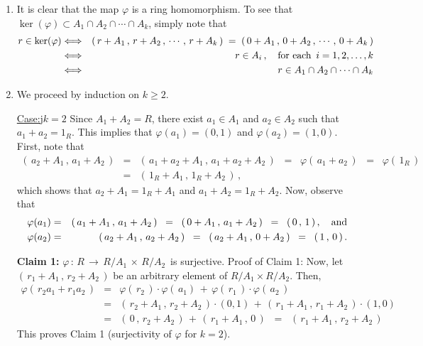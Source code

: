 \begin{enumerate}
\item
	It is clear that the map $\varphi$ is a ring homomorphism.
	To see that $\ker(\varphi) \subset A_{1} \cap A_{2} \cap \cdots \cap A_{k}$,
	simply note that
	\begin{eqnarray*}
	r \in \ker(\varphi)
	& \Longleftrightarrow &
		\left(\, r+A_{1} \,,\, r+A_{2} \,,\, \cdots \,,\, r+A_{k}\,\right)
		\; = \;
		\left(\, 0+A_{1} \,,\, 0+A_{2} \,,\, \cdots \,,\, 0+A_{k}\,\right)
	\\
	& \Longleftrightarrow &
		r \in A_{i}\,, \quad\textnormal{for each \,$i = 1, 2, \ldots, k$}
	\\
	& \Longleftrightarrow &
		r \in A_{1} \cap A_{2} \cap \cdots \cap A_{k}
	\end{eqnarray*}
\item
	We proceed by induction on $k \geq 2$.

	\vskip 0.1cm
	\underline{Case:{\color{white}j}$k = 2$}\quad
	Since $A_{1} + A_{2} = R$, there exist $a_{1} \in A_{1}$ and $a_{2} \in A_{2}$
	such that $a_{1} + a_{2} = 1_{R}$.
	This implies that $\varphi(a_{1}) = (0,1)$ and $\varphi(a_{2}) = (1,0)$.
	First, note that
	\begin{eqnarray*}
	(\,a_{2} + A_{1} \,,\, a_{1} + A_{2}\,)
	& = &
		(\,a_{1} + a_{2} + A_{1} \,,\, a_{1} + a_{2} + A_{2}\,)
	\;\; = \;\;
		\varphi(\,a_{1} + a_{2}\,)
	\;\; = \;\;
		\varphi(\,1_{R}\,)
	\\
	& = &
	(\,1_{R} + A_{1} \,,\, 1_{R} + A_{2}\,)\,,
	\end{eqnarray*}
	which shows that
	$a_{2} + A_{1} = 1_{R} + A_{1}$ and $a_{1} + A_{2} = 1_{R} + A_{2}$.
	Now, observe that
	\begin{eqnarray*}
	\varphi(a_{1}) &=& (\,a_{1} + A_{1} \,,\, a_{1} + A_{2}\,) \;\;=\;\; (\,0 + A_{1} \,,\, a_{1} + A_{2}\,) \;\;=\;\; (\,0 \,,\,1\,)\,,
	\quad\textnormal{and}
	\\
	\varphi(a_{2}) &=& (\,a_{2} + A_{1} \,,\, a_{2} + A_{2}\,) \;\;=\;\; (\,a_{2} + A_{1} \,,\, 0 + A_{2}\,) \;\;=\;\; (\,1\,,\,0\,)\,.
	\end{eqnarray*}

	\vskip 0.1cm
	\textbf{Claim 1:}\;\; $\varphi \,:\, R \, \longrightarrow \, R/A_{1} \, \times \, R/A_{2}$\, is surjective.
	\vskip 0.01cm
	\noindent
	Proof of Claim 1:\;\;
	Now, let $(\,r_{1} + A_{1} \,,\, r_{2} + A_{2}\,)$ be an arbitrary element of $R/A_{1} \times R/A_{2}$.
	Then,
	\begin{eqnarray*}
	\varphi(\,r_{2}a_{1} + r_{1}a_{2}\,)
	& = &
		\varphi(\,r_{2}\,) \cdot \varphi(\,a_{1}) \, + \, \varphi(\,r_{1}\,) \cdot \varphi(\,a_{2}\,)
	\\
	& = &
		(\,r_{2} + A_{1} \,,\, r_{2} + A_{2} \,) \cdot (0,1)
		\,+\,
		(\,r_{1} + A_{1} \,,\, r_{1} + A_{2} \,) \cdot (1,0)
	\\
	& = &
		(\, 0 \,,\, r_{2} + A_{2} \,) \,+\, (\,r_{1} + A_{1} \,,\, 0 \,)
	\;\; = \;\;
		(\,r_{1} + A_{1} \,,\, r_{2} + A_{2}\,)
	\end{eqnarray*}
	This proves Claim 1 (surjectivity of $\varphi$ for $k = 2$).


\end{enumerate}

